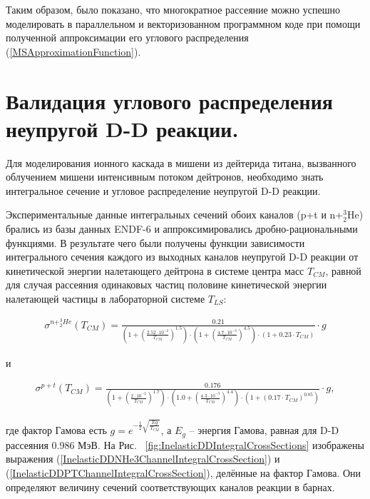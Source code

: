 \documentclass[a4paper,12pt]{article}
\begin{document}
\begin{large}
	Таким образом, было показано, что многократное рассеяние можно успешно моделировать в параллельном и векторизованном программном коде при помощи полученной аппроксимации его углового распределения (\ref{MSApproximationFunction}).
	
	
\clearpage{}
\section{Валидация углового распределения неупругой D-D реакции.}
\label{ValInelasticDD}

	Для моделирования ионного каскада в мишени из дейтерида титана, вызванного облучением мишени интенсивным потоком дейтронов, необходимо знать интегральное сечение и угловое распределение неупругой D-D реакции. 
	
	Экспериментальные данные интегральных сечений обоих каналов (p+t и n+$^3_2$He) брались из базы данных ENDF-6 и аппроксимировались дробно-рациональными функциями.
	В результате чего были получены функции зависимости интегрального сечения каждого из выходных каналов неупругой D-D реакции от кинетической энергии налетающего дейтрона в системе центра масс $T_{CM}$, равной для случая рассеяния одинаковых частиц половине кинетической энергии налетающей частицы в лабораторной системе $T_{LS}$:
	
\begin{equation}
\label{InelasticDDNHe3ChannelIntegralCrossSection}
\begin{aligned} 
  \sigma^{n+^3_2He}(T_{CM}) = \frac{0.21}{\left( 1 + \left(\frac{2.52\cdot 10^{-2}}{T_{CM}} \right)^{1.5} \right) \cdot \left( 1 + \left( \frac{4.7\cdot 10^{-3}}{T_{CM}} \right)^{4.5} \right) \cdot \left( 1+0.23 \cdot T_{CM} \right) } \cdot g
\end{aligned}
\end{equation}

и

\begin{equation}
\label{InelasticDDPTChannelIntegralCrossSection}
\begin{aligned} 
  \sigma^{p+t}(T_{CM}) = \frac{0.176}{\left( 1 + \left(\frac{2\cdot 10^{-2}}{T_{CM}} \right)^{1.7} \right) \cdot \left( 1.0 + \left( \frac{4.3\cdot 10^{-3}}{T_{CM}} \right)^{4.4} \right) \cdot \left( 1+\left( 0.17 \cdot T_{CM} \right)^{0.85} \right) } \cdot g,
\end{aligned}
\end{equation}
	
	где фактор Гамова есть $g=e^{-\frac{1}{2}\sqrt{\frac{Eg}{T_{CM}}}}$, а $E_g$ -- энергия Гамова, равная для D-D рассеяния 0.986 МэВ.
	На Рис. ~\ref{fig:InelasticDDIntegralCrossSections} изображены выражения (\ref{InelasticDDNHe3ChannelIntegralCrossSection}) и (\ref{InelasticDDPTChannelIntegralCrossSection}), делённые на фактор Гамова.
	Они определяют величину сечений соответствующих каналов реакции в барнах.
	

\end{large}
\end{document}
